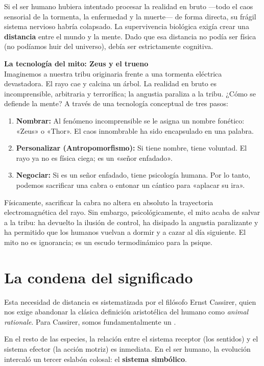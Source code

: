 Si el ser humano hubiera intentado procesar la realidad en bruto —todo el caos sensorial de la tormenta, la enfermedad y la muerte— de forma directa, su frágil sistema nervioso habría colapsado. La supervivencia biológica exigía crear una \textbf{distancia} entre el mundo y la mente. Dado que esa distancia no podía ser física (no podíamos huir del universo), debía ser estrictamente cognitiva.

\begin{argumento}
\textbf{La tecnología del mito: Zeus y el trueno}\\
Imaginemos a nuestra tribu originaria frente a una tormenta eléctrica devastadora. El rayo cae y calcina un árbol. La realidad en bruto es incomprensible, arbitraria y terrorífica; la angustia paraliza a la tribu. ¿Cómo se defiende la mente? A través de una tecnología conceptual de tres pasos:
\begin{enumerate}
    \item \textbf{Nombrar:} Al fenómeno incomprensible se le asigna un nombre fonético: «Zeus» o «Thor». El caos innombrable ha sido encapsulado en una palabra.
    \item \textbf{Personalizar (Antropomorfismo):} Si tiene nombre, tiene voluntad. El rayo ya no es física ciega; es un «señor enfadado».
    \item \textbf{Negociar:} Si es un señor enfadado, tiene psicología humana. Por lo tanto, podemos sacrificar una cabra o entonar un cántico para «aplacar su ira». 
\end{enumerate}
Físicamente, sacrificar la cabra no altera en absoluto la trayectoria electromagnética del rayo. Sin embargo, psicológicamente, el mito acaba de salvar a la tribu: ha devuelto la ilusión de control, ha disipado la angustia paralizante y ha permitido que los humanos vuelvan a dormir y a cazar al día siguiente. El mito no es ignorancia; es un escudo termodinámico para la psique.
\end{argumento}

\section{La condena del significado}

Esta necesidad de distancia es sistematizada por el filósofo Ernst Cassirer, quien nos exige abandonar la clásica definición aristotélica del humano como \textit{animal rationale}. Para Cassirer, somos fundamentalmente un \textbf{\AnimalSimbolico}. 

En el resto de las especies, la relación entre el sistema receptor (los sentidos) y el sistema efector (la acción motriz) es inmediata. En el ser humano, la evolución intercaló un tercer eslabón colosal: el \textbf{sistema simbólico}.

